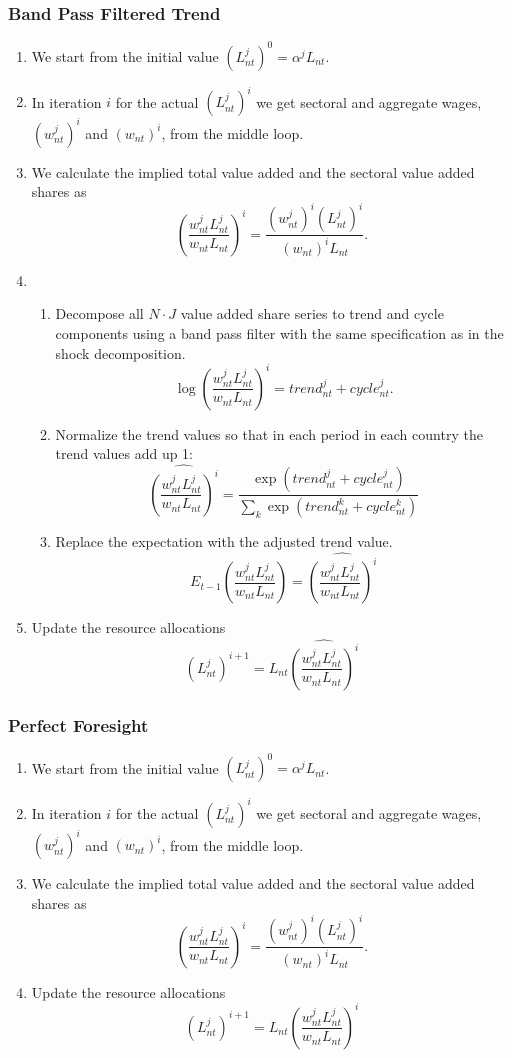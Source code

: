 \documentclass[11pt,oneside,a4paper]{article}
\begin{document}
\subsubsection{Band Pass Filtered Trend}
\begin{enumerate}
  \item We start from the initial value $(L_{nt}^j)^0 = \alpha^j L_{nt}$.
  \item In iteration $i$ for the actual $(L_{nt}^j)^i$ we get sectoral and aggregate wages, $(w_{nt}^j)^i$ and $(w_{nt})^i$, from the middle loop.
  \item We calculate the implied total value added and the sectoral value added shares as
    $$\left(\frac{w_{nt}^j L_{nt}^j}{w_{nt} L_{nt}}\right)^i = \frac{(w_{nt}^j)^i (L_{nt}^j)^i}{(w_{nt})^i L_{nt}}.$$
  \item
    \begin{enumerate}
      \item Decompose all $N \cdot J$ value added share series to trend and cycle components using a band pass filter with the same specification as in the shock decomposition.
        $$\log\left(\frac{w_{nt}^j L_{nt}^j}{w_{nt} L_{nt}}\right)^i = trend^j_{nt} + cycle_{nt}^j.$$
      \item Normalize the trend values so that in each period in each country the trend values add up 1:
        $$\widehat{\left(\frac{w_{nt}^j L_{nt}^j}{w_{nt} L_{nt}}\right)^i} = \frac{\exp(trend^j_{nt} + cycle_{nt}^j)}{\sum_k \exp(trend^k_{nt} + cycle_{nt}^k)}$$
      \item Replace the expectation with the adjusted trend value.
      $$E_{t - 1} \left( \frac{w_{nt}^j L_{nt}^j}{w_{nt} L_{nt}}\right) = \widehat{\left(\frac{w_{nt}^j L_{nt}^j}{w_{nt} L_{nt}}\right)^i}$$
    \end{enumerate} 
  \item Update the resource allocations
    $$(L_{nt}^j)^{i + 1} = L_{nt} \widehat{\left(\frac{w_{nt}^j L_{nt}^j}{w_{nt} L_{nt}}\right)^i}$$
\end{enumerate}

\subsubsection{Perfect Foresight}
\begin{enumerate}
  \item We start from the initial value $(L_{nt}^j)^0 = \alpha^j L_{nt}$. 
  \item In iteration $i$ for the actual $(L_{nt}^j)^i$ we get sectoral and aggregate wages, $(w_{nt}^j)^i$ and $(w_{nt})^i$, from the middle loop.
  \item We calculate the implied total value added and the sectoral value added shares as
    $$\left(\frac{w_{nt}^j L_{nt}^j}{w_{nt} L_{nt}}\right)^i = \frac{(w_{nt}^j)^i (L_{nt}^j)^i}{(w_{nt})^i L_{nt}}.$$
  \item Update the resource allocations
    $$(L_{nt}^j)^{i + 1} = L_{nt} \left(\frac{w_{nt}^j L_{nt}^j}{w_{nt} L_{nt}}\right)^i$$
\end{enumerate}
\end{document}
